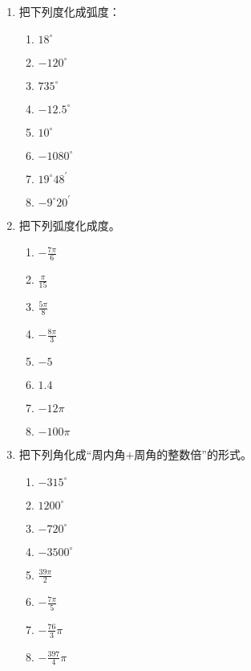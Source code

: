 \begin{enumerate}
    \item 把下列度化成弧度：
\begin{multicols}{4}
\begin{enumerate}[(1)]
    \item $18^{\circ }$
    \item $- 120^{\circ }$
    \item $735^{\circ }$
    \item $-12.5^{\circ}$
    \item $10^{\circ}$
    \item $-1080^{\circ}$
    \item $19^{\circ}48^{\prime}$
    \item $-9^{\circ}20^{\prime}$
\end{enumerate}
\end{multicols}
    
\item     把下列弧度化成度。
\begin{multicols}{4}
\begin{enumerate}[(1)]
    \item $- \frac {7\pi }6$
    \item $\frac {\pi} {15}$
    \item $\frac {5\pi} {8}$
    \item $-\frac {8\pi} {3}$
    \item $-5$
    \item $1.4$
    \item $-12\pi$
    \item $-100\pi$
\end{enumerate}
\end{multicols}
\item 把下列角化成“周内角$+$周角的整数倍”的形式。
\begin{multicols}{4}
\begin{enumerate}[(1)]
    \item $-315^{\circ}$
    \item $1200^{\circ}$
    \item $-720^{\circ}$
    \item $-3500^{\circ}$
    \item $\frac{39\pi}{2}$
    \item $-\frac{7\pi}{5}$
    \item $- \frac {76}3\pi$
    \item $- \frac {397}4\pi$
\end{enumerate}
\end{multicols}


\end{enumerate}

